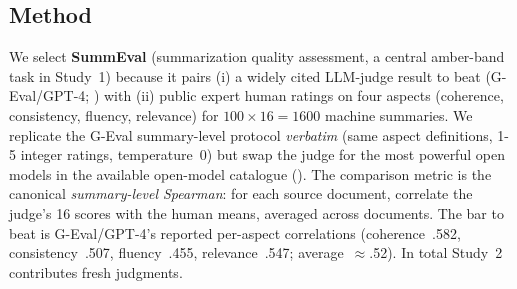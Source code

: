\subsection{Method}
We select \textbf{SummEval} \citep{fabbri2021summeval} (summarization quality assessment, a central amber-band task
in Study~1) because it pairs (i) a widely cited LLM-judge result to beat (G-Eval/GPT-4; \citealp{liu2023geval})
with (ii) public expert human ratings on four aspects (coherence, consistency, fluency, relevance) for
$100\times16=1600$ machine summaries. We replicate the G-Eval summary-level protocol \emph{verbatim} (same aspect
definitions, 1-5 integer ratings, temperature~0) but swap the judge for the \ONEmodels{} most powerful open models
in the available open-model catalogue (\ONEpanel). The comparison metric is the canonical \emph{summary-level Spearman}: for each
source document, correlate the judge's 16 scores with the human means, averaged across documents. The bar to beat is
G-Eval/GPT-4's reported per-aspect correlations (coherence~.582, consistency~.507, fluency~.455, relevance~.547;
average~$\approx$.52). In total Study~2 contributes \ONEnjudg{} fresh judgments.

